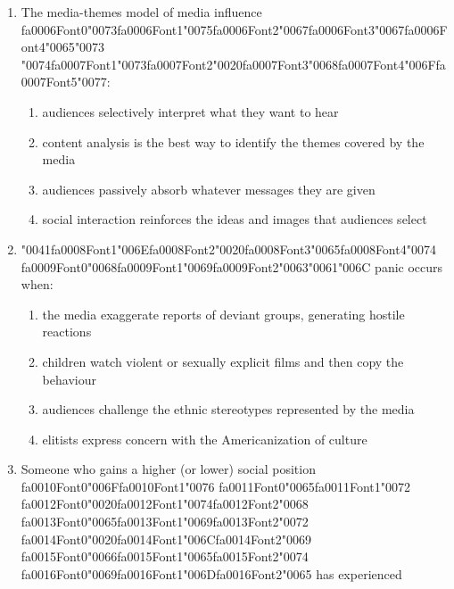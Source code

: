 \documentclass[12pt]{article}
\begin{document}
\begin{enumerate}[label=\arabic*.]
\begin{enumerate}[label=(\alph*)]
    \item both boys and girls being closely attached to their fathers, but girls breaking away
\end{enumerate}
\item The media-themes model of media influence {\csname fa0006Font0\endcsname\char"0073}{\csname fa0006Font1\endcsname\char"0075}{\csname fa0006Font2\endcsname\char"0067}{\csname fa0006Font3\endcsname\char"0067}{\csname fa0006Font4\endcsname\char"0065}{\char"0073} {\char"0074}{\csname fa0007Font1\endcsname\char"0073}{\csname fa0007Font2\endcsname\char"0020}{\csname fa0007Font3\endcsname\char"0068}{\csname fa0007Font4\endcsname\char"006F}{\csname fa0007Font5\endcsname\char"0077}:
\begin{enumerate}[label=(\alph*)]
    \item audiences selectively interpret what they want to hear
    \item content analysis is the best way to identify the themes covered by the media
    \item audiences passively absorb whatever messages they are given
    \item social interaction reinforces the ideas and images that audiences select
\end{enumerate}
\item {\char"0041}{\csname fa0008Font1\endcsname\char"006E}{\csname fa0008Font2\endcsname\char"0020}{\csname fa0008Font3\endcsname\char"0065}{\csname fa0008Font4\endcsname\char"0074} {\csname fa0009Font0\endcsname\char"0068}{\csname fa0009Font1\endcsname\char"0069}{\csname fa0009Font2\endcsname\char"0063}{\char"0061}{\char"006C} panic occurs when:
\begin{enumerate}[label=(\alph*)]
    \item the media exaggerate reports of deviant groups, generating hostile reactions
    \item children watch violent or sexually explicit films and then copy the behaviour
    \item audiences challenge the ethnic stereotypes represented by the media
    \item elitists express concern with the Americanization of culture
\end{enumerate}
\item Someone who gains a higher (or lower) social position {\csname fa0010Font0\endcsname\char"006F}{\csname fa0010Font1\endcsname\char"0076} {\csname fa0011Font0\endcsname\char"0065}{\csname fa0011Font1\endcsname\char"0072} {\csname fa0012Font0\endcsname\char"0020}{\csname fa0012Font1\endcsname\char"0074}{\csname fa0012Font2\endcsname\char"0068} {\csname fa0013Font0\endcsname\char"0065}{\csname fa0013Font1\endcsname\char"0069}{\csname fa0013Font2\endcsname\char"0072} {\csname fa0014Font0\endcsname\char"0020}{\csname fa0014Font1\endcsname\char"006C}{\csname fa0014Font2\endcsname\char"0069} {\csname fa0015Font0\endcsname\char"0066}{\csname fa0015Font1\endcsname\char"0065}{\csname fa0015Font2\endcsname\char"0074} {\csname fa0016Font0\endcsname\char"0069}{\csname fa0016Font1\endcsname\char"006D}{\csname fa0016Font2\endcsname\char"0065} has experienced

\end{enumerate}
\end{document}
